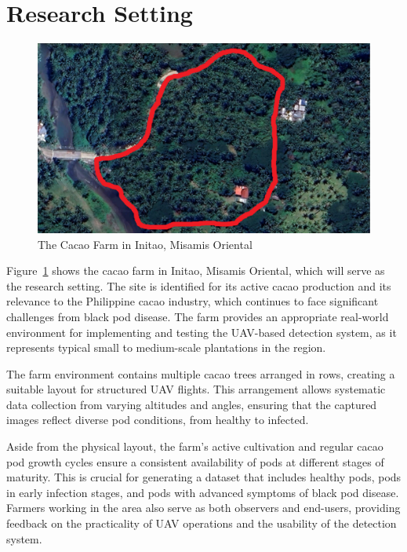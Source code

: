 \section{Research Setting}

\begin{figure}[H]
	\centering
	\caption{The Cacao Farm in Initao, Misamis Oriental}
	\label{fig:cacao_farm}
	\includegraphics[width=1\textwidth]{figures/Cacao_Farm.pdf}
\end{figure}

Figure~\ref{fig:cacao_farm} shows the cacao farm in Initao, Misamis Oriental, which will serve as the research setting. 
The site is identified for its active cacao production and its relevance to the Philippine cacao industry, which continues to face significant challenges from black pod disease. 
The farm provides an appropriate real-world environment for implementing and testing the UAV-based detection system, as it represents typical small to medium-scale plantations in the region.

The farm environment contains multiple cacao trees arranged in rows, creating a suitable layout for structured UAV flights. 
This arrangement allows systematic data collection from varying altitudes and angles, ensuring that the captured images reflect diverse pod conditions, from healthy to infected. 

Aside from the physical layout, the farm’s active cultivation and regular cacao pod growth cycles ensure a consistent availability of pods at different stages of maturity. 
This is crucial for generating a dataset that includes healthy pods, pods in early infection stages, and pods with advanced symptoms of black pod disease. 
Farmers working in the area also serve as both observers and end-users, providing feedback on the practicality of UAV operations and the usability of the detection system.

